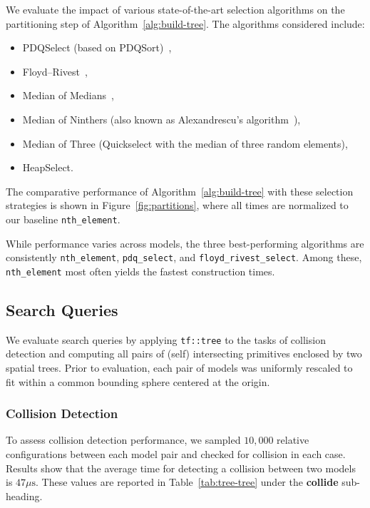 We evaluate the impact of various state-of-the-art selection
algorithms on the partitioning step of
Algorithm~\ref{alg:build-tree}. The algorithms considered include:

\begin{itemize}
  \item PDQSelect (based on PDQSort)~\cite{pdqSort},
  \item Floyd–Rivest~\cite{floyd1975expected},
  \item Median of Medians~\cite{mom},
  \item Median of Ninthers (also known as Alexandrescu’s
        algorithm~\cite{alexandrescu-sorting}),
  \item Median of Three (Quickselect with the median of three
        random elements),
  \item HeapSelect.
\end{itemize}

The comparative performance of
Algorithm~\ref{alg:build-tree} with these selection strategies
is shown in Figure~\ref{fig:partitions}, where all times are
normalized to our baseline \texttt{nth\_element}.

While performance varies across models, the three best-performing
algorithms are consistently \texttt{nth\_element},
\texttt{pdq\_select}, and \texttt{floyd\_rivest\_select}.
Among these, \texttt{nth\_element} most often yields the
fastest construction times.



\subsection{Search Queries}

We evaluate search queries by applying \texttt{tf::tree} to the tasks
of collision detection and computing all pairs of (self) intersecting
primitives enclosed by two spatial trees. Prior to evaluation, each
pair of models was uniformly rescaled to fit within a common bounding
sphere centered at the origin. 


\subsubsection{Collision Detection}

To assess collision detection performance, we sampled $10{,}000$
relative configurations between each model pair and checked for
collision in each case. Results show that the average time for
detecting a collision between two models is $47 \mu\mathrm{s}$. These values
are reported in Table~\ref{tab:tree-tree} under the
\textbf{collide} sub-heading.

